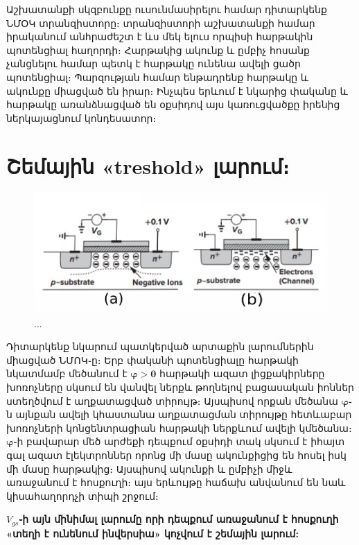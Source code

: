\documentclass[
]{book}
\begin{document}
Աշխատանքի սկզբունքը ուսունմասիրելու համար դիտարկենք ՆՄՕԿ տրանզիստորը։
տրանզիստորի աշխատանքի համար իրականում անհրաժեշտ է ևս մեկ ելուս որպիսի
հարթակին պոտենցիալ հաղորդի։ Հարթակից ակունք և ըմբիչ հոսանք չանցնելու
համար պետկ է հարթակը ունենա ավելի ցածր պոտենցիալ։ Պարզության համար
ենթադրենք հարթակը և ակունքը միացված են իրար։ Ինչպես երևում է նկարից
փականը և հարթակը առանձնացված են օքսիդով այս կառուցվածքը իրենից
ներկայացնում կոնդեսատոր։

\hypertarget{ux577ux565ux574ux561ux575ux56bux576-treshold-ux56cux561ux580ux578ux582ux574}{%
\section{Շեմային «treshold»
լարում։}\label{ux577ux565ux574ux561ux575ux56bux576-treshold-ux56cux561ux580ux578ux582ux574}}

\begin{figure}

{\centering \includegraphics[width=1\linewidth]{imige/th} 

}

\caption{...}\label{fig:unnamed-chunk-2}
\end{figure}

Դիտարկենք նկարում պատկերված արտաքին լարումներին միացված ՆՄՈԿ֊ը։ Երբ
փականի պոտենցիալը հարթակի նկատմամբ մեծանում է \(\pmb{\varphi>0}\)
հարթակի ազատ լիցքակիրները խոռոչները սկսում են վանվել ներքև թողնելով
բացասական իոններ ստեղծվում է աղքատացված տիրույթ։ Այսպիսով որքան մեծանա
\(\pmb{\varphi}\)֊ն այնքան ավելի կհաստանա աղքատացման տիրույթը հետևաբար
խոռոչների կոնցենտրացիան հարթակի ներքևում ավելի կմեծանա։
\(\pmb{\varphi}\)֊ի բավարար մեծ արժեքի դեպքում օքսիդի տակ սկսում է իհայտ
գալ ազատ էլեկտրոններ որոնց մի մասը ակունքիցից են հոսել իսկ մի մասը
հարթակից։ Այսպիսով ակունքի և ըմբիչի միջև առաջանում է հոսքուղի։ այս
երևույթը հաճախ անվանում են նաև կիսահաղորդչի տիպի շրջում։

\textbf{\(V_{gs}\)֊ի այն մինիմալ լարումը որի դեպքում առաջանում է
հոսքուղի «տեղի է ունենում ինվերսիա» կոչվում է շեմային լարում:}
\end{document}
